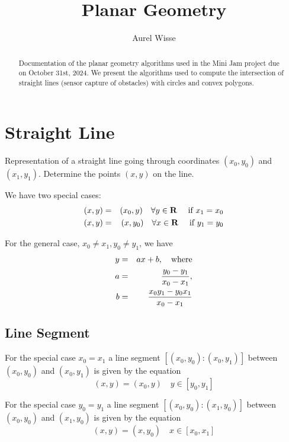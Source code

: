 \documentclass[11pt]{article}
\newcommand{\Rb}{{\bf{R}}}
\begin{document}
%
%
\title{Planar Geometry}
\author{Aurel Wisse}
\maketitle
%
%
\begin{abstract}
Documentation of the planar geometry algorithms used in the
Mini Jam project due on October 31st, 2024. We present the algorithms used to
compute the intersection of straight lines (sensor capture of obstacles) with
circles and convex polygons.
\end{abstract}

%
\section{Straight Line}
\label{sec:straight:line}

Representation of a straight line going through
coordinates $(x_0, y_0)$ and $(x_1, y_1)$. Determine the points $(x, y)$ on the
line.

We have two special cases: 
\begin{eqnarray}
    (x, y) &=& (x_0, y)\quad\forall y\in\Rb\quad \text{ if } x_1 = x_0 \\
    (x, y) &=& (x, y_0)\quad\forall x\in\Rb\quad \text{ if } y_1 = y_0
\end{eqnarray}

For the general case, $x_0 \neq x_1, y_0 \neq y_1$, we have
\begin{eqnarray}
    y &=& ax+b,\quad \text{where} \label{eq:line:general}\\
    a &=& \frac{y_0 - y_1}{x_0 - x_1}, \notag \\
    b &=& \frac{x_0 y_1 - y_0 x_1}{x_0 - x_1} \notag
\end{eqnarray}

\subsection{Line Segment}
\label{sec:line:segment}

For the special case $x_0 = x_1$ a line segment $[(x_0, y_0):(x_0, y_1)]$ 
between $(x_0, y_0)$ and $(x_0, y_1)$ is given by the equation
\begin{equation}
    (x, y) = (x_0, y)\quad y\in [y_0, y_1]
\end{equation}

For the special case $y_0 = y_1$ a line segment $[(x_0, y_0):(x_1, y_0)]$ 
between $(x_0, y_0)$ and $(x_1, y_0)$ is given by the equation
\begin{equation}
    (x, y) = (x, y_0)\quad x\in [x_0, x_1]
\end{equation}
\end{document}
